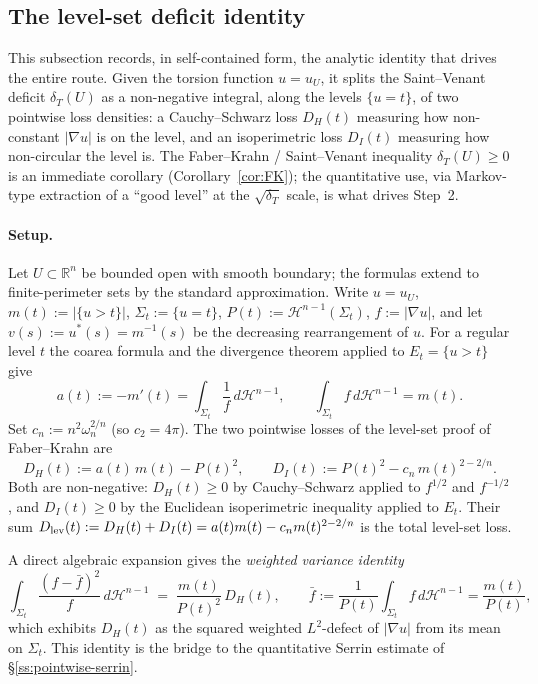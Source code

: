 \documentclass[11pt]{amsart}
\newcommand{\R}{\mathbb R}
\newcommand{\dT}{\delta_T}
\newcommand{\HH}{\mathcal H}
\begin{document}
\subsection{The level-set deficit identity}\label{ss:level-id}

This subsection records, in self-contained form, the analytic
identity that drives the entire route.  Given the torsion function
\(u=u_U\), it splits the Saint--Venant deficit \(\dT(U)\) as a
non-negative integral, along the levels \(\{u=t\}\), of two pointwise
loss densities: a Cauchy--Schwarz loss \(D_H(t)\) measuring how
non-constant \(|\nabla u|\) is on the level, and an isoperimetric
loss \(D_I(t)\) measuring how non-circular the level is.  The
Faber--Krahn / Saint--Venant inequality \(\dT(U)\ge 0\) is an
immediate corollary (Corollary~\ref{cor:FK}); the quantitative use,
via Markov-type extraction of a ``good level'' at the
\(\sqrt{\dT}\) scale, is what drives Step~2.

\paragraph{Setup.}  Let \(U\subset\R^n\) be bounded open with smooth
boundary; the formulas extend to finite-perimeter sets by the standard
approximation.  Write \(u=u_U\), \(m(t):=|\{u>t\}|\),
\(\Sigma_t:=\{u=t\}\), \(P(t):=\HH^{n-1}(\Sigma_t)\),
\(f:=|\nabla u|\), and let \(v(s):=u^{*}(s)=m^{-1}(s)\) be the
decreasing rearrangement of \(u\).  For a regular level \(t\) the
coarea formula and the divergence theorem applied to \(E_t=\{u>t\}\)
give
\begin{equation}\label{eq:lev-coarea}
   a(t):=-m'(t)=\int_{\Sigma_t}\frac{1}{f}\,d\HH^{n-1},
   \qquad
   \int_{\Sigma_t}f\,d\HH^{n-1}=m(t).
\end{equation}
Set \(c_n:=n^{2}\omega_n^{2/n}\) (so \(c_2=4\pi\)).  The two
pointwise losses of the level-set proof of Faber--Krahn are
\begin{equation}\label{eq:DH-DI-def}
   D_H(t):=a(t)\,m(t)-P(t)^{2},
   \qquad
   D_I(t):=P(t)^{2}-c_n\,m(t)^{2-2/n}.
\end{equation}
Both are non-negative: \(D_H(t)\ge 0\) by Cauchy--Schwarz applied to
\(f^{1/2}\) and \(f^{-1/2}\), and \(D_I(t)\ge 0\) by the Euclidean
isoperimetric inequality applied to \(E_t\).  Their sum
\(D_{\rm lev}(t):=D_H(t)+D_I(t)=a(t)m(t)-c_n m(t)^{2-2/n}\) is the
total level-set loss.

A direct algebraic expansion gives the \emph{weighted variance
identity}
\begin{equation}\label{eq:lev-variance}
   \int_{\Sigma_t}\frac{(f-\bar f)^{2}}{f}\,d\HH^{n-1}
   \;=\;\frac{m(t)}{P(t)^{2}}\,D_H(t),
   \qquad
   \bar f:=\frac{1}{P(t)}\int_{\Sigma_t}f\,d\HH^{n-1}=\frac{m(t)}{P(t)},
\end{equation}
which exhibits \(D_H(t)\) as the squared weighted \(L^{2}\)-defect of
\(|\nabla u|\) from its mean on \(\Sigma_t\).  This identity is the
bridge to the quantitative Serrin estimate of
\S\ref{ss:pointwise-serrin}.
\end{document}
